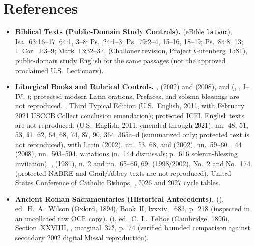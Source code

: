 \section*{References}

\begin{itemize}[leftmargin=1.5em,itemsep=0.35em]

\item \textbf{Biblical Texts (Public-Domain Study Controls).}  (eBible \texttt{latvuc}), Isa.~63:16--17, 64:1, 3--8; Ps.~24:1--3; Ps.~79:2--4, 15--16, 18--19; Ps.~84:8, 13; 1~Cor.~1:3--9; Mark~13:32--37.  (Challoner revision, Project Gutenberg~1581), public-domain study English for the same passages (not the approved proclaimed U.S.\ Lectionary).

\item \textbf{Liturgical Books and Rubrical Controls.} ,  (2002) and  (2008),  and  (, ,  I--IV, ); protected modern Latin orations, Prefaces, and solemn blessings are not reproduced. , Third Typical Edition (U.S.\ English, 2011, with February 2021 USCCB Collect conclusion emendation); protected ICEL English texts are not reproduced.  (U.S.\ English, 2011, emended through 2021), nn.~48, 51, 53, 61, 62, 64, 68, 74, 87, 90, 364, 365a--d (summarized only; protected text is not reproduced), with Latin  (2002), nn.~53, 68, and  (2002), nn.~59--60. ~44 (2008), nn.~503--504,  variations (n.~144 dismissals; p.~616 solemn-blessing invitation). ,  (1981), n.~2 and  nn.~65--66, 69;  (1998/2002), No.~2 and No.~174 (protected NABRE and Grail/Abbey texts are not reproduced). United States Conference of Catholic Bishops, , 2026 and 2027 cycle tables.

\item \textbf{Ancient Roman Sacramentaries (Historical Antecedents).}  (), ed.\ H.~A.\ Wilson (Oxford, 1894), Book~II, lxxxiv, ~683, p.~218 (inspected in an uncollated raw OCR copy).  (), ed.\ C.~L.\ Feltoe (Cambridge, 1896), Section~XXVIIII, , marginal~372, p.~74 (verified bounded comparison against secondary 2002 digital Missal reproduction).


\end{itemize}
